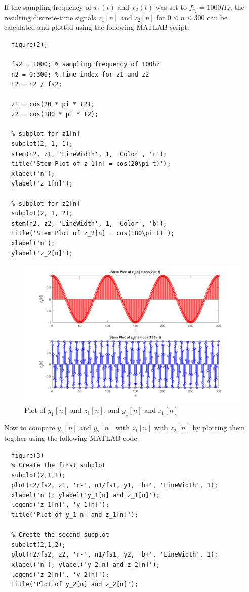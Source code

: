 \documentclass[a4paper, 10pt]{article}
\begin{document}
\hfill

\noindent If the sampling frequency of $x_1(t)$ and $x_2(t)$ was set to $f_{s_2}=1000Hz$, the resulting discrete-time signals
$z_1[n]$ and $z_2[n]$ for $0\leq n\leq 300$ can be calculated and plotted using the following MATLAB script:
\begin{lstlisting}[style=Matlab-editor, basicstyle=\small\ttfamily]
  % plot z1 and z2
  figure(2);
  
  fs2 = 1000; % sampling frequency of 100hz
  n2 = 0:300; % Time index for z1 and z2
  t2 = n2 / fs2;
  
  z1 = cos(20 * pi * t2);
  z2 = cos(180 * pi * t2);
  
  % subplot for z1[n]
  subplot(2, 1, 1);
  stem(n2, z1, 'LineWidth', 1, 'Color', 'r');
  title('Stem Plot of z_1[n] = cos(20\pi t)');
  xlabel('n');
  ylabel('z_1[n]');
  
  % subplot for z2[n]
  subplot(2, 1, 2);
  stem(n2, z2, 'LineWidth', 1, 'Color', 'b');
  title('Stem Plot of z_2[n] = cos(180\pi t)');
  xlabel('n');
  ylabel('z_2[n]');  
\end{lstlisting}
\begin{figure}[H]
  \centering
  \includegraphics[width=14cm]{images/q3_z.png}
  \caption{Plot of $y_1[n]$ and $z_1[n]$, and $y_1[n]$ and $z_1[n]$}
\end{figure}
Now to compare $y_1[n]$ and $y_2[n]$ with $z_1[n]$ with $z_2[n]$ by plotting them togther using the following MATLAB code:
\begin{lstlisting}[style=Matlab-editor, basicstyle=\small\ttfamily]
  % plotting z1 and y1 and z2 and y2
  figure(3)
  % Create the first subplot
  subplot(2,1,1);
  plot(n2/fs2, z1, 'r-', n1/fs1, y1, 'b+', 'LineWidth', 1);
  xlabel('n'); ylabel('y_1[n] and z_1[n]');
  legend('z_1[n]', 'y_1[n]');
  title('Plot of y_1[n] and z_1[n]');
  
  % Create the second subplot
  subplot(2,1,2);
  plot(n2/fs2, z2, 'r-', n1/fs1, y2, 'b+', 'LineWidth', 1);
  xlabel('n'); ylabel('y_2[n] and z_2[n]');
  legend('z_2[n]', 'y_2[n]');
  title('Plot of y_2[n] and z_2[n]');
\end{lstlisting}
\end{document}
